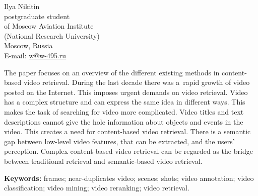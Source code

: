 

\begin{flushright}
\sf\small
Ilya Nikitin \\
postgraduate student \\
of Moscow Aviation Institute \\
(National Research University) \\
Moscow, Russia \\
E-mail: \href{mailto:w@w-495.ru}{w@w-495.ru} \\
\end{flushright}





The paper focuses on an overview of the different existing methods
in content-based video retrieval.
During the last decade there was a~rapid growth
of video posted on the Internet.
This imposes urgent demands on video retrieval.
Video has a complex structure and can express the same idea
in different ways. This makes the task of searching for video more complicated.
Video titles and text descriptions cannot give the hole information
about objects and events in the video.
This creates a need for content-based video retrieval.
There is a semantic gap between low-level video features,
that can be extracted, and the users' perception.
Complex content-based video retrieval
can be regarded as the bridge between traditional retrieval
and semantic-based video retrieval.


{\bf Keywords:}
frames;
near-duplicates video;
scenes;
shots;
video annotation;
video classification;
video mining;
video reranking;
video retrieval.



